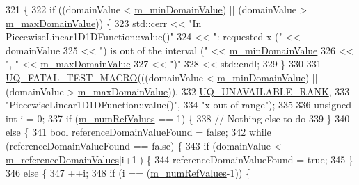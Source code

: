 \begin{DoxyCode}
321 \{
322   \textcolor{keywordflow}{if} ((domainValue < \hyperlink{class_q_u_e_s_o_1_1_base1_d1_d_function_a7b18b3854ee74ef5befbc67b75ebbdc5}{m\_minDomainValue}) || (domainValue > 
      \hyperlink{class_q_u_e_s_o_1_1_base1_d1_d_function_aa0025999ccab2145cd46c0a81e260e8f}{m\_maxDomainValue})) \{
323     std::cerr << \textcolor{stringliteral}{"In PiecewiseLinear1D1DFunction::value()"}
324               << \textcolor{stringliteral}{": requested x ("}            << domainValue
325               << \textcolor{stringliteral}{") is out of the interval ("} << \hyperlink{class_q_u_e_s_o_1_1_base1_d1_d_function_a7b18b3854ee74ef5befbc67b75ebbdc5}{m\_minDomainValue}
326               << \textcolor{stringliteral}{", "}                         << \hyperlink{class_q_u_e_s_o_1_1_base1_d1_d_function_aa0025999ccab2145cd46c0a81e260e8f}{m\_maxDomainValue}
327               << \textcolor{stringliteral}{")"}
328               << std::endl;
329   \}
330 
331   \hyperlink{_defines_8h_a56d63d18d0a6d45757de47fcc06f574d}{UQ\_FATAL\_TEST\_MACRO}(((domainValue < \hyperlink{class_q_u_e_s_o_1_1_base1_d1_d_function_a7b18b3854ee74ef5befbc67b75ebbdc5}{m\_minDomainValue}) || (domainValue 
      > \hyperlink{class_q_u_e_s_o_1_1_base1_d1_d_function_aa0025999ccab2145cd46c0a81e260e8f}{m\_maxDomainValue})),
332                       \hyperlink{namespace_q_u_e_s_o_a7d4679800a430ae8e473c1c7bc0bfb21}{UQ\_UNAVAILABLE\_RANK},
333                       \textcolor{stringliteral}{"PiecewiseLinear1D1DFunction::value()"},
334                       \textcolor{stringliteral}{"x out of range"});
335 
336   \textcolor{keywordtype}{unsigned} \textcolor{keywordtype}{int} i = 0;
337   \textcolor{keywordflow}{if} (\hyperlink{class_q_u_e_s_o_1_1_piecewise_linear1_d1_d_function_a1ff5c7e5243f6a763409a68e86681129}{m\_numRefValues} == 1) \{
338     \textcolor{comment}{// Nothing else to do}
339   \}
340   \textcolor{keywordflow}{else} \{
341     \textcolor{keywordtype}{bool} referenceDomainValueFound = \textcolor{keyword}{false};
342     \textcolor{keywordflow}{while} (referenceDomainValueFound == \textcolor{keyword}{false}) \{
343       \textcolor{keywordflow}{if} (domainValue < \hyperlink{class_q_u_e_s_o_1_1_piecewise_linear1_d1_d_function_abda9e4143096bf0bf935b7c9173aa2cc}{m\_referenceDomainValues}[i+1]) \{
344         referenceDomainValueFound = \textcolor{keyword}{true};
345       \}
346       \textcolor{keywordflow}{else} \{
347         ++i;
348         \textcolor{keywordflow}{if} (i == (\hyperlink{class_q_u_e_s_o_1_1_piecewise_linear1_d1_d_function_a1ff5c7e5243f6a763409a68e86681129}{m\_numRefValues}-1)) \{

\end{DoxyCode}

